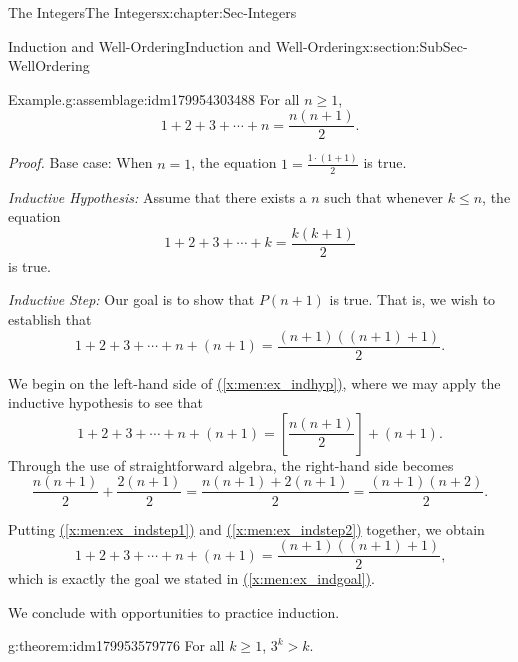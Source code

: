 \documentclass[oneside,10pt,]{book}
\newcommand{\xreffont}{\relax}
\numberwithin{equation}{section}
\renewcommand{\le}{\leqslant}
\renewcommand{\ge}{\geqslant}
\begin{document}
\begin{chapterptx}{The Integers}{}{The Integers}{}{}{x:chapter:Sec-Integers}
\begin{sectionptx}{Induction and Well-Ordering}{}{Induction and Well-Ordering}{}{}{x:section:SubSec-WellOrdering}
\begin{assemblage}{Example.}{g:assemblage:idm179954303488}%
For all \(n \ge 1\),%
\begin{equation*}
1+ 2 + 3 + \cdots + n = \frac{n(n+1)}{2}\text{.}
\end{equation*}
%
\par
\emph{Proof.} Base case: When \(n = 1\), the equation \(1 = \frac{1\cdot (1+1)}{2}\) is true.%
\par
\emph{Inductive Hypothesis:} Assume that there exists a \(n\) such that whenever \(k \le n\), the equation%
\begin{equation}
1+ 2 + 3 + \cdots + k = \frac{k(k+1)}{2}\label{x:men:ex_indhyp}
\end{equation}
is true.%
\par
\emph{Inductive Step:} Our goal is to show that \(P(n+1)\) is true. That is, we wish to establish that%
\begin{equation}
1+ 2 + 3 + \cdots + n + (n+1) = \frac{(n+1)((n+1)+1)}{2}\text{.}\label{x:men:ex_indgoal}
\end{equation}
%
\par
We begin on the left-hand side of \hyperref[x:men:ex_indhyp]{({\xreffont\ref{x:men:ex_indhyp}})}, where we may apply the inductive hypothesis to see that%
\begin{equation}
1+ 2 + 3 + \cdots + n + (n+1) = \left[\frac{n(n+1)}{2}\right] + (n+1)\text{.}\label{x:men:ex_indstep1}
\end{equation}
Through the use of straightforward algebra, the right-hand side becomes%
\begin{equation}
\frac{n(n+1)}{2} + \frac{2(n+1)}{2} = \frac{n(n+1) + 2(n+1)}{2} = \frac{(n+1)(n+2)}{2}\text{.}\label{x:men:ex_indstep2}
\end{equation}
%
\par
Putting \hyperref[x:men:ex_indstep1]{({\xreffont\ref{x:men:ex_indstep1}})} and \hyperref[x:men:ex_indstep2]{({\xreffont\ref{x:men:ex_indstep2}})} together, we obtain%
\begin{equation*}
1+ 2 + 3 + \cdots + n + (n+1) = \frac{(n+1)((n+1)+1)}{2}\text{,}
\end{equation*}
which is exactly the goal we stated in \hyperref[x:men:ex_indgoal]{({\xreffont\ref{x:men:ex_indgoal}})}.%
\end{assemblage}
We conclude with opportunities to practice induction.%
\begin{theorem}{}{}{g:theorem:idm179953579776}%
For all \(k\ge 1\), \(3^k > k\).%
\end{theorem}

\end{sectionptx}
\end{chapterptx}
\end{document}
